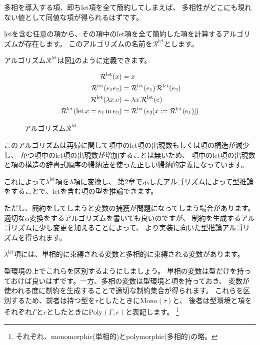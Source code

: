 多相を導入する項、即ちlet項を全て簡約してしまえば、
多相性がどこにも現れない値として同値な項が得られるはずです。

letを含む任意の項から、その項中のlet項を全て簡約した項を計算するアルゴリズムが存在します。
このアルゴリズムの名前を$\mathcal R^\mathrm{let}$とします。

アルゴリズム$\mathcal R^\mathrm{let}$は図\ref{fig:algorithm-rlet}のように定義できます。

\begin{figure}[htbp]
  \begin{align*}
    \mathcal R^\mathrm{let}(x) &= x \\
    \mathcal R^\mathrm{let}(e_1 e_2) &=
      \mathcal R^\mathrm{let}(e_1) \, \mathcal R^\mathrm{let}(e_2) \\
    \mathcal R^\mathrm{let}(\lambda x . e) &=
      \lambda x . \mathcal R^\mathrm{let}(e) \\
    \mathcal R^\mathrm{let}(\mathrm{let} \, x = e_1 \, \mathrm{in} \, e_2) &=
      \mathcal R^\mathrm{let}(e_2 [x := \mathcal R^\mathrm{let}(e_1)])
  \end{align*}
  \caption{アルゴリズム$\mathcal R^\mathrm{let}$}
  \label{fig:algorithm-rlet}
\end{figure}

このアルゴリズムは再帰に関して項中のlet項の出現数もしくは項の構造が減少し、
かつ項中のlet項の出現数が増加することは無いため、
項中のlet項の出現数と項の構造の辞書式順序の帰納法を使った正しい帰納的定義になっています。

これによって$\lambda^\mathrm{let}$項を$\lambda$項に変換し、
第2章で示したアルゴリズムによって型推論をすることで、letを含む項の型を推論できます。

ただし、簡約をしてしまうと変数の捕獲が問題になってしまう場合があります。
適切な$\alpha$変換をするアルゴリズムを書いても良いのですが、
制約を生成するアルゴリズムに少し変更を加えることによって、
より実装に向いた型推論アルゴリズムを得られます。

$\lambda^\mathrm{let}$項には、単相的に束縛される変数と多相的に束縛される変数があります。

型環境の上でこれらを区別するようにしましょう。
単相の変数は型だけを持っておけば良いはずです。一方、多相の変数は型環境と項を持っておき、
変数が使われる度に制約を生成することで適切な制約集合が得られます。
これらを区別するため、前者は持つ型を$\tau$としたときに$\mathrm{Mono}(\tau)$と、
後者は型環境と項をそれぞれ$\Gamma$と$e$としたときに$\mathrm{Poly}(\Gamma, e)$と表記します。
\footnote{それぞれ、monomorphic(単相的)とpolymorphic(多相的)の略。}

